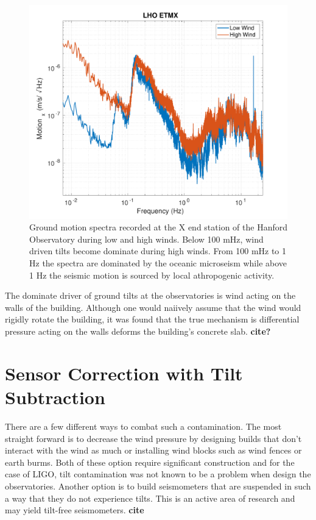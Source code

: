 \documentclass [12pt, proquest]{uwthesis}[2019]
\begin{document}
\begin{figure}%
\begin{center}
\includegraphics[width=\textwidth]{windComp.pdf}
\caption{Ground motion spectra recorded at the X end station of the Hanford Observatory during low and high winds. Below 100 mHz, wind driven tilts become dominate during high winds. From 100 mHz to 1 Hz the spectra are dominated by the oceanic microseism while above 1 Hz the seismic motion is sourced by local athropogenic activity.}
\label{wind}
\end{center}
\end{figure}

The dominate driver of ground tilts at the observatories is wind acting on the walls of the building. Although one would naiively assume that the wind would rigidly rotate the building, it was found that the true mechanism is differential pressure acting on the walls deforms the building's concrete slab. \textbf{cite?} 

\section{Sensor Correction with Tilt Subtraction}

\quad There are a few different ways to combat such a contamination. The most straight forward is to decrease the wind pressure by designing builds that don't interact with the wind as much or installing wind blocks such as wind fences or earth burms. Both of these option require significant construction and for the case of LIGO, tilt contamination was not known to be a problem when design the observatories. Another option is to build seismometers that are suspended in such a way that they do not experience tilts. This is an active area of research and may yield tilt-free seismometers. \textbf{cite}
\end{document}
